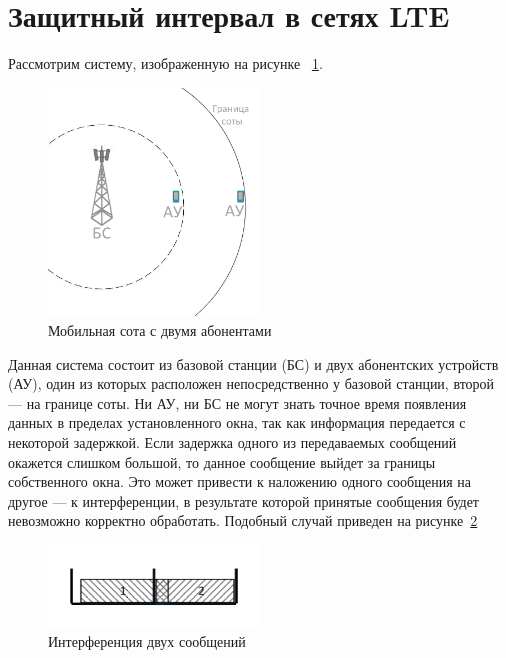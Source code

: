 \section{Защитный интервал в сетях LTE}
Рассмотрим систему, изображенную на рисунке ~\ref{fig:vol_mobile_cell}.
\begin{figure}[H]
    \centering
    \includegraphics[width=0.5\textwidth]{img/vol_mobile_cell}
    \caption{Мобильная сота с двумя абонентами}
    \label{fig:vol_mobile_cell}
\end{figure}

Данная система состоит из базовой станции (БС) и двух абонентских устройств (АУ), один из которых
расположен непосредственно у базовой станции, второй --- на границе соты. Ни АУ, ни БС не могут знать
точное время появления данных в пределах установленного окна, так как информация передается с
некоторой задержкой. Если задержка одного из передаваемых сообщений окажется слишком большой, то
данное сообщение выйдет за границы собственного окна. Это может привести к наложению одного сообщения
на другое --- к интерференции, в результате которой принятые сообщения будет невозможно корректно
обработать. Подобный случай приведен на рисунке~\ref{fig:vol_interf}
\begin{figure}[H]
    \centering
    \includegraphics[width=0.5\textwidth]{img/vol_interf}
    \caption{Интерференция двух сообщений}
    \label{fig:vol_interf}
\end{figure}

